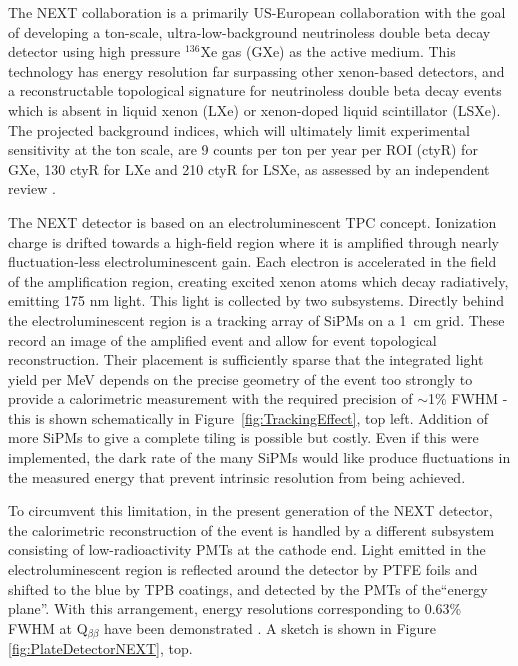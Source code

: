 The NEXT collaboration is a primarily US-European collaboration with the goal of developing a ton-scale, ultra-low-background neutrinoless double beta decay detector using high pressure $^{136}$Xe gas (GXe) as the active medium.  This technology has energy resolution far surpassing other xenon-based detectors, and a reconstructable topological signature for neutrinoless double beta decay events which is absent in liquid xenon (LXe) or xenon-doped liquid scintillator (LSXe).  The projected background indices, which will ultimately limit experimental sensitivity at the ton scale, are 9 counts per ton per year per ROI (ctyR) for GXe, 130 ctyR for LXe and 210 ctyR for LSXe, as assessed by an independent review \cite{LRP}.

The NEXT detector is based on an electroluminescent TPC concept. Ionization charge is drifted towards a high-field region where it is amplified through nearly fluctuation-less electroluminescent gain.  Each electron is accelerated in the field of the amplification region, creating excited xenon atoms which decay radiatively, emitting 175 nm light.  This light is collected by two subsystems. Directly behind the electroluminescent region is a tracking array of SiPMs on a 1~cm grid.  These record an image of the amplified event and allow for event topological reconstruction.  Their placement is sufficiently sparse that the integrated light yield per MeV depends on the precise geometry of the event too strongly to provide a calorimetric measurement with the required precision of $\sim$1\% FWHM - this is shown schematically in Figure~\ref{fig:TrackingEffect}, top left.  Addition of more SiPMs to give a complete tiling is possible but costly.  Even if this were implemented, the dark rate of the many SiPMs would like produce fluctuations in the measured energy that prevent intrinsic resolution from being achieved.  

To circumvent this limitation, in the present generation of the NEXT detector, the calorimetric reconstruction of the event is handled by a different subsystem consisting of low-radioactivity PMTs at the cathode end.  Light emitted in the electroluminescent region is reflected around the detector by PTFE foils and shifted to the blue by TPB coatings, and detected by the PMTs of the``energy plane''.  With this arrangement, energy resolutions corresponding to  0.63\% FWHM at Q$_{\beta\beta}$ have been demonstrated \cite{Alvarez:2012yxw}.  A sketch is shown in Figure~ \ref{fig:PlateDetectorNEXT}, top.




